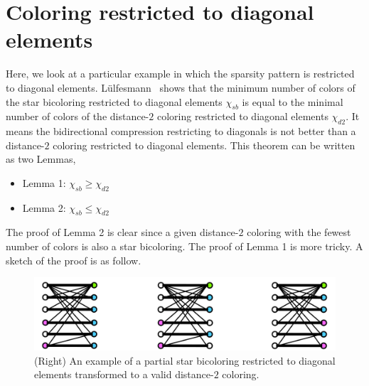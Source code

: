 \documentclass[12pt, twoside,a4paper,toc=bibliography]{scrbook}
\begin{document}
\clearpage
\section{Coloring restricted to diagonal elements}
\label{s.part.color.diag}
Here, we look at a particular example in which the sparsity pattern is restricted to diagonal elements.
Lülfesmann~\cite{Lulfesmann2012Fap} shows that the minimum number of colors of
the star bicoloring restricted to diagonal elements $\chi_{sb}$ is equal to
the minimal number of colors of the distance-$2$ coloring restricted
to diagonal elements $\chi_{d2}$.
It means the bidirectional compression restricting to diagonals is not better than
a distance-$2$ coloring restricted to diagonal elements. 
This theorem can be written as two Lemmas,
\begin{itemize}
\item Lemma 1: $\chi_{sb} \geq \chi_{d2}$
\item Lemma 2: $\chi_{sb} \leq \chi_{d2}$
\end{itemize}
The proof of Lemma 2 is clear since
a given distance-$2$ coloring with the fewest number of colors is also a star bicoloring.
The proof of Lemma 1 is more tricky. A sketch of the proof is as follow.
\begin{figure}
\includegraphics[width=\linewidth]{proof1.png}
\caption{
(Right) An example of a partial star bicoloring restricted to diagonal elements
transformed to a valid distance-$2$ coloring.}
\label{proof1}
\end{figure}
\end{document}
